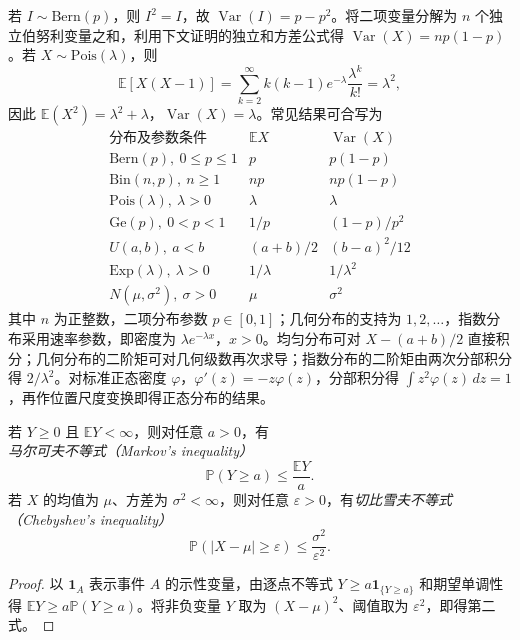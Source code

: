 \begin{solve}
若 $I\sim\mathrm{Bern}(p)$，则 $I^2=I$，故 $\operatorname{Var}(I)=p-p^2$。将二项变量分解为 $n$ 个独立伯努利变量之和，利用下文证明的独立和方差公式得 $\operatorname{Var}(X)=np(1-p)$。若 $X\sim\mathrm{Pois}(\lambda)$，则
\[
  \mathbb E[X(X-1)]
    =\sum_{k=2}^{\infty}k(k-1)e^{-\lambda}\frac{\lambda^k}{k!}
    =\lambda^2,
\]
因此 $\mathbb E(X^2)=\lambda^2+\lambda$，$\operatorname{Var}(X)=\lambda$。常见结果可合写为
\[
\begin{array}{c|c|c}
  \text{分布及参数条件}&\mathbb E X&\operatorname{Var}(X)\\ \hline
  \mathrm{Bern}(p),\ 0\le p\le1&p&p(1-p)\\
  \mathrm{Bin}(n,p),\ n\ge1&np&np(1-p)\\
  \mathrm{Pois}(\lambda),\ \lambda>0&\lambda&\lambda\\
  \mathrm{Ge}(p),\ 0<p<1&1/p&(1-p)/p^2\\
  U(a,b),\ a<b&(a+b)/2&(b-a)^2/12\\
  \mathrm{Exp}(\lambda),\ \lambda>0&1/\lambda&1/\lambda^2\\
  N(\mu,\sigma^2),\ \sigma>0&\mu&\sigma^2
\end{array}
\]
其中 $n$ 为正整数，二项分布参数 $p\in[0,1]$；几何分布的支持为 $1,2,\ldots$，指数分布采用速率参数，即密度为 $\lambda e^{-\lambda x}$，$x>0$。均匀分布可对 $X-(a+b)/2$ 直接积分；几何分布的二阶矩可对几何级数再次求导；指数分布的二阶矩由两次分部积分得 $2/\lambda^2$。对标准正态密度 $\varphi$，$\varphi'(z)=-z\varphi(z)$，分部积分得 $\int z^2\varphi(z)\,dz=1$，再作位置尺度变换即得正态分布的结果。
\end{solve}

\begin{theorem}
\label{thm:study-markov-chebyshev}
若 $Y\ge0$ 且 $\mathbb E Y<\infty$，则对任意 $a>0$，有\emph{马尔可夫不等式（Markov's inequality）}
\begin{equation}
  \mathbb P(Y\ge a)\le\frac{\mathbb E Y}{a}.
  \label{eq:study-markov-inequality}
\end{equation}
若 $X$ 的均值为 $\mu$、方差为 $\sigma^2<\infty$，则对任意 $\varepsilon>0$，有\emph{切比雪夫不等式（Chebyshev's inequality）}
\begin{equation}
  \mathbb P(|X-\mu|\ge\varepsilon)
    \le\frac{\sigma^2}{\varepsilon^2}.
  \label{eq:study-chebyshev-inequality}
\end{equation}
\end{theorem}

\begin{proof}
以 $\mathbf1_A$ 表示事件 $A$ 的示性变量，由逐点不等式 $Y\ge a\mathbf1_{\{Y\ge a\}}$ 和期望单调性得 $\mathbb E Y\ge a\mathbb P(Y\ge a)$。将非负变量 $Y$ 取为 $(X-\mu)^2$、阈值取为 $\varepsilon^2$，即得第二式。
\end{proof}

